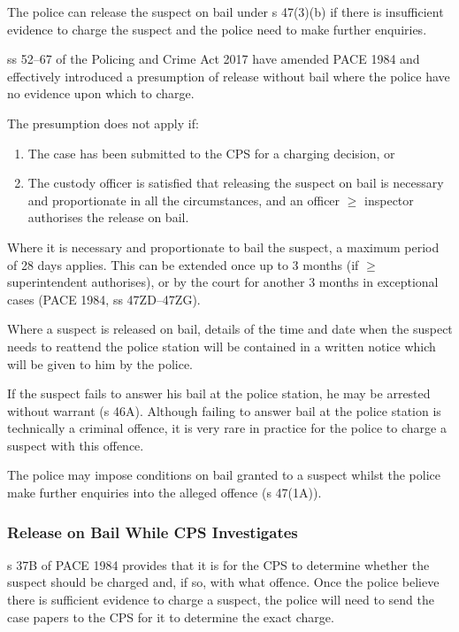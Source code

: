 \documentclass[
]{article}
\providecommand{\tightlist}{%
  \setlength{\itemsep}{0pt}\setlength{\parskip}{0pt}}
\begin{document}
The police can release the suspect on bail under s 47(3)(b) if there is
insufficient evidence to charge the suspect and the police need to make
further enquiries.

ss 52--67 of the Policing and Crime Act 2017 have amended PACE 1984 and
effectively introduced a presumption of release without bail where the
police have no evidence upon which to charge.

The presumption does not apply if:

\begin{enumerate}
\def\labelenumi{\arabic{enumi}.}
\tightlist
\item
  The case has been submitted to the CPS for a charging decision, or
\item
  The custody officer is satisfied that releasing the suspect on bail is
  necessary and proportionate in all the circumstances, and an officer
  \(\geq\) inspector authorises the release on bail.
\end{enumerate}

Where it is necessary and proportionate to bail the suspect, a maximum
period of 28 days applies. This can be extended once up to 3 months (if
\(\geq\) superintendent authorises), or by the court for another 3
months in exceptional cases (PACE 1984, ss 47ZD--47ZG).

Where a suspect is released on bail, details of the time and date when
the suspect needs to reattend the police station will be contained in a
written notice which will be given to him by the police.

If the suspect fails to answer his bail at the police station, he may be
arrested without warrant (s 46A). Although failing to answer bail at the
police station is technically a criminal offence, it is very rare in
practice for the police to charge a suspect with this offence.

The police may impose conditions on bail granted to a suspect whilst the
police make further enquiries into the alleged offence (s 47(1A)).

\hypertarget{release-on-bail-while-cps-investigates}{%
\subsubsection{Release on Bail While CPS
Investigates}\label{release-on-bail-while-cps-investigates}}

s 37B of PACE 1984 provides that it is for the CPS to determine whether
the suspect should be charged and, if so, with what offence. Once the
police believe there is sufficient evidence to charge a suspect, the
police will need to send the case papers to the CPS for it to determine
the exact charge.
\end{document}
